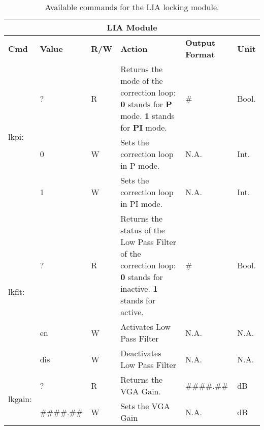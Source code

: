 \begin{center}
    \begin{longtable}{| m{} | m{} | m{} | m{} | m{}| m{} |}
    \caption{Available commands for the LIA locking module.\label{\QubeModel _cmd_table_lia}}\\
    \hline
    \multicolumn{6}{|c|}{\textbf{LIA Module}} \\
    \hline \hline    
    \textbf{Cmd} & \textbf{Value} & \textbf{R/W} & \textbf{Action} & \textbf{Output \newline Format} & \textbf{Unit} \\
    \hline
    
    \multirow{3}{0.1\textwidth}{lkpi:}  & ? & R & Returns the mode of the correction loop:
                                            \newline \textbf{0} stands for \textbf{P} mode.
                                            \newline \textbf{1} stands for \textbf{PI} mode. &  \# & Bool. \\
                                        \cline{2-6}
                                        &  0  & W & Sets the correction loop in P mode. & N.A. & Int. \\
                                        \cline{2-6}
                                        &  1  & W & Sets the correction loop in PI mode. & N.A. & Int. \\
    \hline
    
    \multirow{3}{0.1\textwidth}{lkflt:}  & ? & R & Returns the status of the Low Pass Filter of the correction loop:
                                            \newline \textbf{0} stands for inactive.
                                            \newline \textbf{1} stands for active. & \# & Bool. \\
                                        \cline{2-6}
                                        &  en  & W & Activates Low Pass Filter & N.A. & N.A.\\
                                        \cline{2-6}
                                        &  dis  & W & Deactivates Low Pass Filter & N.A. & N.A.\\
    \hline
    
    \multirow{2}{0.1\textwidth}{lkgain:}  & ? & R & Returns the VGA Gain.   &   \#\#\#\#.\#\#  & dB \\
                                        \cline{2-6}
                                        &  \#\#\#\#.\#\#  & W & Sets the VGA Gain & N.A. & dB \\
    \hline
    

\end{longtable}
\end{center}
